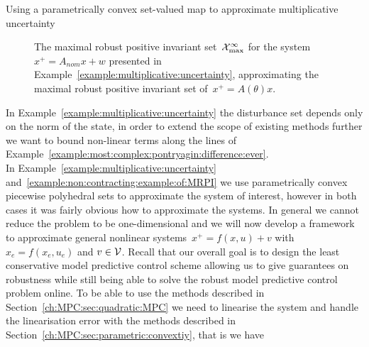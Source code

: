 \begin{example}{Using a parametrically convex set-valued map to approximate multiplicative uncertainty}
\begin{figure}\centering
{}
\caption[MRPI set for linear system with multiplicative uncertainty]{The maximal robust positive invariant set~$\mathcal X_{\max}^\infty$ for the system~$x^+=A_{nom}x+w$ presented in Example~\ref{example:multiplicative:uncertainty}, approximating the maximal robust positive invariant set of~$x^+=A(\theta)x$.}
\label{fig:example:multiplicative:uncertainty}
\end{figure}
\end{example}
%
%
%
%
%
In Example~\ref{example:multiplicative:uncertainty} the disturbance set depends only on the norm of the state, in order to extend the scope of existing methods further we want to bound non-linear terms along the lines of Example~\ref{example:most:complex:pontryagin:difference:ever}.
%
\\[1em]
%
%
%
%
%
%
\noindent\mysplit In Example~\ref{example:multiplicative:uncertainty} and~\ref{example:non:contracting:example:of:MRPI} we use parametrically convex piecewise polyhedral sets to approximate the system of interest, however in both cases it was fairly obvious how to approximate the systems.
%
In general we cannot reduce the problem to be one-dimensional and we will now develop a framework to approximate general nonlinear systems~$x^+ = f(x,u)+v$ with $x_e=f(x_e,u_e)$ and $v\in\mathcal V$.
%
Recall that our overall goal is to design the least conservative model predictive control scheme allowing us to give guarantees on robustness while still being able to solve the robust model predictive control problem online.
%
To be able to use the methods described in Section~\ref{ch:MPC:sec:quadratic:MPC} we need to linearise the system and handle the linearisation error with the methods described in Section~\ref{ch:MPC:sec:parametric:convextiy}, that is we have
